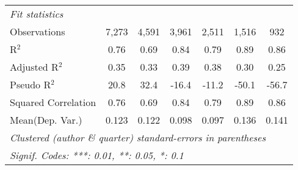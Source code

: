 \begin{tabular}{lcccccc}
   \midrule
   \emph{Fit statistics}\\
   Observations                                               & 7,273       & 4,591        & 3,961         & 2,511        & 1,516       & 932\\  
   R$^2$                                                      & 0.76        & 0.69         & 0.84          & 0.79         & 0.89        & 0.86\\  
   Adjusted R$^2$                                             & 0.35        & 0.33         & 0.39          & 0.38         & 0.30        & 0.25\\  
   Pseudo R$^2$                                               & 20.8        & 32.4         & -16.4         & -11.2        & -50.1       & -56.7\\  
   Squared Correlation                                        & 0.76        & 0.69         & 0.84          & 0.79         & 0.89        & 0.86\\  
Mean(Dep. Var.) & 0.123 & 0.122 & 0.098 & 0.097 & 0.136 & 0.141 \\
   \midrule \midrule
   \multicolumn{7}{l}{\emph{Clustered (author \& quarter) standard-errors in parentheses}}\\
   \multicolumn{7}{l}{\emph{Signif. Codes: ***: 0.01, **: 0.05, *: 0.1}}\\
\end{tabular}
\par\endgroup

